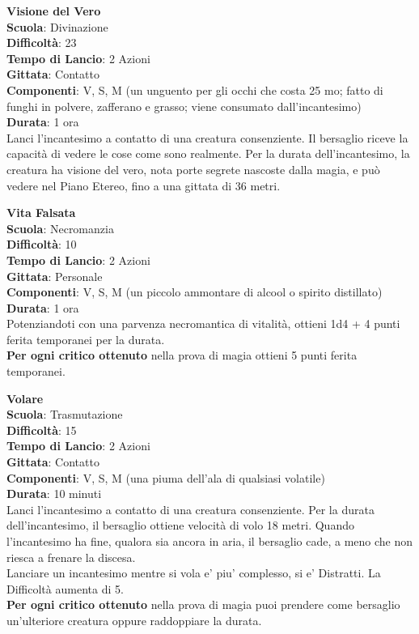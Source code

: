\begin{multicols}{2}
\medskip\textbf{Visione del Vero}\\
\textbf{Scuola}: Divinazione\\
\textbf{Difficoltà}: 23\\
\textbf{Tempo di Lancio}: 2 Azioni\\
\textbf{Gittata}: Contatto\\
\textbf{Componenti}: V, S, M (un unguento per gli occhi che costa 25 mo; fatto di funghi in polvere, zafferano e grasso; viene consumato dall'incantesimo)\\
\textbf{Durata}: 1 ora\\
Lanci l'incantesimo a contatto di una creatura consenziente. Il bersaglio riceve la capacità di vedere le cose come sono realmente. Per la durata dell'incantesimo, la creatura ha visione del vero, nota porte segrete nascoste dalla magia, e può vedere nel Piano Etereo, fino a una gittata di 36 metri.

\medskip\textbf{Vita Falsata}\\
\textbf{Scuola}: Necromanzia\\
\textbf{Difficoltà}: 10\\
\textbf{Tempo di Lancio}: 2 Azioni\\
\textbf{Gittata}: Personale\\
\textbf{Componenti}: V, S, M (un piccolo ammontare di alcool o spirito distillato)\\
\textbf{Durata}: 1 ora\\
Potenziandoti con una parvenza necromantica di vitalità, ottieni 1d4 + 4 punti ferita temporanei per la durata.\\
\textbf{Per ogni critico ottenuto} nella prova di magia ottieni 5 punti ferita temporanei.

\medskip\textbf{Volare}\\
\textbf{Scuola}: Trasmutazione\\
\textbf{Difficoltà}: 15\\
\textbf{Tempo di Lancio}: 2 Azioni\\
\textbf{Gittata}: Contatto\\
\textbf{Componenti}: V, S, M (una piuma dell'ala di qualsiasi volatile)\\
\textbf{Durata}: 10 minuti \\
Lanci l'incantesimo a contatto di una creatura consenziente. Per la durata dell'incantesimo, il bersaglio ottiene velocità di volo 18 metri. Quando l'incantesimo ha fine, qualora sia ancora in aria, il bersaglio cade, a meno che non riesca a frenare la discesa.\\
Lanciare un incantesimo mentre si vola e' piu' complesso, si e' Distratti. La Difficoltà aumenta di 5.\\
\textbf{Per ogni critico ottenuto} nella prova di magia puoi prendere come bersaglio un'ulteriore creatura oppure raddoppiare la durata.


\end{multicols}
